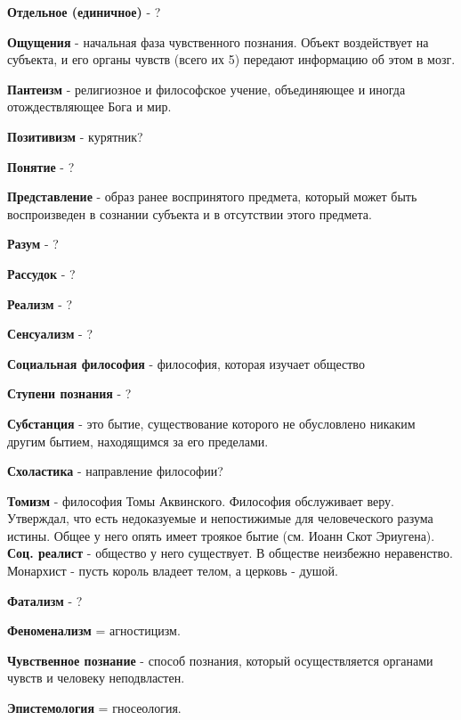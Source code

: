 \documentclass[12pt,a4paper]{article}
\begin{document}
\textbf{Отдельное (единичное)} - ?

\textbf{Ощущения} -  начальная фаза чувственного познания. Объект воздействует на субъекта, и его органы чувств (всего их 5) передают информацию об этом в мозг.

\textbf{Пантеизм} -  религиозное и философское учение, объединяющее и иногда отождествляющее Бога и мир.

\textbf{Позитивизм} - курятник?

\textbf{Понятие} - ?

\textbf{Представление} - образ ранее воспринятого предмета, который может быть воспроизведен в сознании субъекта и в отсутствии этого предмета.

\textbf{Разум} - ?

\textbf{Рассудок} - ?

\textbf{Реализм} - ?

\textbf{Сенсуализм} - ?

\textbf{Социальная философия} - философия, которая изучает общество

\textbf{Ступени познания} - ?

\textbf{Субстанция} - это бытие, существование которого не обусловлено никаким другим бытием, находящимся за его пределами.

\textbf{Схоластика} - направление философии?

\textbf{Томизм} - философия Томы Аквинского. Философия обслуживает веру. Утверждал, что есть недоказуемые и непостижимые для человеческого разума истины. Общее у него опять имеет троякое бытие (см. Иоанн Скот Эриугена). \textbf{Соц. реалист} - общество у него существует. В обществе неизбежно неравенство. Монархист - пусть король владеет телом, а церковь - душой.

\textbf{Фатализм} - ?

\textbf{Феноменализм} = агностицизм.

\textbf{Чувственное познание} - способ познания, который осуществляется органами чувств и человеку неподвластен.

\textbf{Эпистемология} = гносеология.
\end{document}
